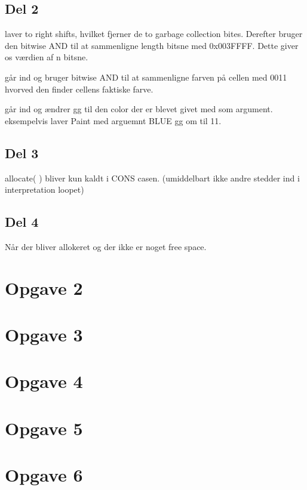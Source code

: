 \subsection{Del 2}
\label{O1_2}
\begin{my_itemize}
\item[Length] laver to right shifts, hvilket fjerner de to garbage collection bites. Derefter bruger den bitwise AND til at sammenligne length bitsne med 0x003FFFF. Dette giver os værdien af n bitsne.
\item[Color] går ind og bruger bitwise AND til at sammenligne farven på cellen med 0011 hvorved den finder cellens faktiske farve.
\item[Paint] går ind og ændrer gg til den color der er blevet givet med som argument. eksempelvis laver Paint med arguemnt BLUE gg om til 11.
\end{my_itemize}

\subsection{Del 3}
\label{O1_3}
allocate( ) bliver kun kaldt i CONS casen.  (umiddelbart ikke andre stedder ind i interpretation loopet)

\subsection{Del 4}
\label{O1_4}
Når der bliver allokeret og der ikke er noget free space.

\section{Opgave 2}
\label{O2}

\section{Opgave 3}
\label{O3}

\section{Opgave 4}
\label{O4}

\section{Opgave 5}
\label{O5}

\section{Opgave 6}
\label{O6}
